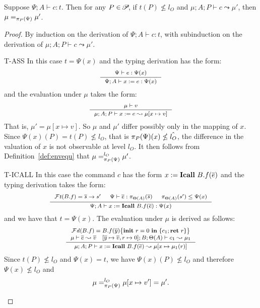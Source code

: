 {{{%

\begin{lemma}\label{lem:comsafe}
Suppose $\Psi; A \vdash c : t$. Then for any $P\in\!\mathscr{P}\!$,
if $t(P)\nleq l_{O}$ and $\mu;A; P \vdash c \leadsto \mu' $, then
$\mu =_{\pi_{{P}}({\Psi})} \mu'$.
\end{lemma}
\begin{proof}
By induction on the derivation of $\Psi; A \vdash c : t$, with subinduction
on the derivation of $\mu;A; P \vdash c \leadsto \mu'.$

\begin{ProofEnumDesc}
\item[T-ASS]
In this case $t = \Psi(x)$ and
the typing derivation has the form:
\begin{equation*}\myeqsize
\inference
{\Psi \vdash e : \Psi(x)}
{\Psi; A  \vdash \lcASS{x}{e} : \Psi(x)}
\end{equation*}
and the evaluation under $\mu$ takes the form:
$$\myeqsize
\inference
{\mu \vdash v}
{\mu; A; P \vdash \lcASS{x}{e} \leadsto \mu[x \mapsto v] }
$$
That is, $\mu' = \mu[x \mapsto v].$
So $\mu$ and $\mu'$ differ possibly
only in the mapping of $x$.
Since $\Psi(x)(P) = t(P) \nleq l_{O}$,
that is $\pi_{{P}}({\Psi})(x) \nleq \hat{l_{O}}$,
the difference in the valuation of $x$ is not observable
at level $l_O.$
It then follows from Definition~\ref{def:envequ}
that $\mu =_{\pi_{{P}}({\Psi})}^{l_{O}} \mu' $.

\item[T-ICALL] In this case
the command $c$ has the form
${x}:=\textbf{Icall}~{B.f}({\overline{e}})$
and the typing derivation
takes the form:
$$\myeqsize
\inference
{
\FT(B.f) = \overline{s} \rightarrow {s'} &
\Psi \vdash \overline{e} : \app{\overline{s}}{\Theta(A)} &
\app{s'}{\Theta(A)} \leq \Psi(x)}
{\Psi; A \vdash \lcCALL{x}{B.f}{\overline{e}} : \Psi(x) }
$$
and we have that
$t = \Psi(x).$
The evaluation under $\mu$ is derived as follows:
$$\myeqsize
\inference{
\FD(B.f) = \lpFUN{B.f}{\overline{y}}{c_1} \\
\mu\vdash\overline{e} \leadsto \overline{v} \quad
[\overline{y} \mapsto \overline{v}, r \mapsto 0] ; B; \Theta(A) \vdash c_1
\leadsto \mu_1
}
{\mu;A;P \vdash \lcCALL{x}{B.f}{\overline{e}} \leadsto
\mu [x \mapsto \mu_1(r) ]}
$$
Since $t(P) \not \leq l_O$ and $\Psi(x) = t$, we have
$\Psi(x)(P) \not \leq l_O$
and therefore $\Psi(x) \not \leq l_O$
and
$$\footnotesize\mu =^{l_O}_{\pi_{{P}}({\Psi})} \mu[x \mapsto v'] = \mu'.$$


\end{ProofEnumDesc}
\end{proof}}}}
